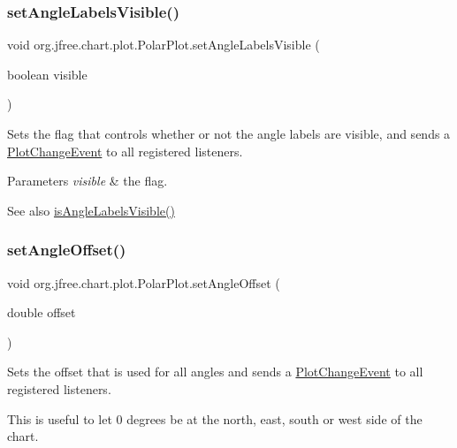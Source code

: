 \subsubsection{\texorpdfstring{set\+Angle\+Labels\+Visible()}{setAngleLabelsVisible()}}
{\footnotesize\ttfamily void org.\+jfree.\+chart.\+plot.\+Polar\+Plot.\+set\+Angle\+Labels\+Visible (\begin{DoxyParamCaption}\item[{boolean}]{visible }\end{DoxyParamCaption})}

Sets the flag that controls whether or not the angle labels are visible, and sends a \mbox{\hyperlink{}{Plot\+Change\+Event}} to all registered listeners.


\begin{DoxyParams}{Parameters}
{\em visible} & the flag.\\
\hline
\end{DoxyParams}
\begin{DoxySeeAlso}{See also}
\mbox{\hyperlink{classorg_1_1jfree_1_1chart_1_1plot_1_1_polar_plot_a065406a06be64510889c2f61ef57da30}{is\+Angle\+Labels\+Visible()}} 
\end{DoxySeeAlso}
\mbox{\label{classorg_1_1jfree_1_1chart_1_1plot_1_1_polar_plot_af7db4e2fc7a6b978b7d62feaa6f63a53}} 
\subsubsection{\texorpdfstring{set\+Angle\+Offset()}{setAngleOffset()}}
{\footnotesize\ttfamily void org.\+jfree.\+chart.\+plot.\+Polar\+Plot.\+set\+Angle\+Offset (\begin{DoxyParamCaption}\item[{double}]{offset }\end{DoxyParamCaption})}

Sets the offset that is used for all angles and sends a \mbox{\hyperlink{}{Plot\+Change\+Event}} to all registered listeners.

This is useful to let 0 degrees be at the north, east, south or west side of the chart.


